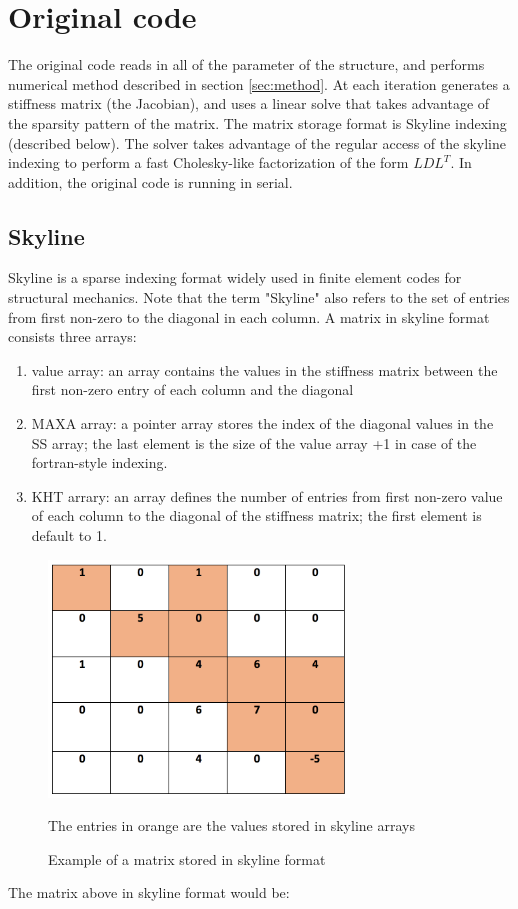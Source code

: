 \documentclass[11pt]{article}
\begin{document}
\section{Original code}\label{sec:originalCode}
The original code reads in all of the parameter of the structure, and performs numerical method described in section \ref{sec:method}. At each iteration generates a stiffness matrix (the Jacobian), and uses a linear solve that takes advantage of the sparsity pattern of the matrix. The matrix storage format is Skyline indexing (described below). The solver takes advantage of the regular access of the skyline indexing to perform a fast Cholesky-like factorization of the form $LDL^T$. In addition, the original code is running in serial.


\subsection{Skyline}
Skyline is a sparse indexing format widely used in finite element codes for structural mechanics. Note that the term "Skyline" also refers to the set of entries from first non-zero to the diagonal in each column. A matrix in skyline format consists three arrays: 
\begin{enumerate}

\item value array: an array contains the values in the stiffness matrix between the first non-zero entry of each column and the diagonal
\item MAXA array: a  pointer array stores the index of the diagonal values in the SS array; the last element is the size of the value array +1 in case of the fortran-style indexing.
\item KHT arrary: an array defines the number of entries from first non-zero value of each column to the diagonal of the stiffness matrix; the first element is default to 1. 
\end{enumerate}

\begin{figure}[h]
\begin{center}

\includegraphics[width=8cm]{skyline}
\label{fig:skyline}\\
\caption{Example of a matrix stored in skyline format}
The entries in orange are the values stored in skyline arrays
\end{center}

\end{figure}
The matrix above in skyline format would be:
\end{document}
